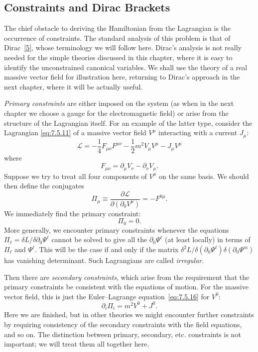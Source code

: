 \subsection{Constraints and Dirac Brackets}

The chief obstacle to deriving the Hamiltonian from the Lagrangian is the
occurrence of constraints. The standard analysis of this problem is that of
Dirac~\hyperref[ref:7.5]{[5]}, whose terminology we will follow here. Dirac's analysis is not
really needed for the simple theories discussed in this chapter, where it is
easy to identify the unconstrained canonical variables. We shall use the
theory of a real massive vector field for illustration here, returning to
Dirac's approach in the next chapter, where it will be actually useful.

\emph{Primary constraints} are either imposed on the system (as when in the
next chapter we choose a gauge for the electromagnetic field) or arise from
the structure of the Lagrangian itself. For an example of the latter type,
consider the Lagrangian \eqref{eq:7.5.11} of a massive vector field $V^\mu$ interacting
with a current $J_\mu$:
\begin{equation}
\mathcal L=-\frac14F_{\mu\nu}F^{\mu\nu}
-\frac12m^2V_\mu V^\mu-J_\mu V^\mu
\tag{7.6.1}\label{eq:7.6.1}
\end{equation}
where
\begin{equation}
F_{\mu\nu}=\partial_\mu V_\nu-\partial_\nu V_\mu.
\tag{7.6.2}\label{eq:7.6.2}
\end{equation}
Suppose we try to treat all four components of $V^\mu$ on the same basis. We
should then define the conjugates
\begin{equation}
\Pi_\mu\equiv\frac{\partial\mathcal L}{\partial(\partial_0V^\mu)}=-F^{0\mu}.
\tag{7.6.3}\label{eq:7.6.3}
\end{equation}
We immediately find the primary constraint:
\begin{equation}
\Pi_0=0.
\tag{7.6.4}\label{eq:7.6.4}
\end{equation}
More generally, we encounter primary constraints whenever the equations
$\Pi_\ell=\delta L/\delta\partial_0\Psi^\ell$ cannot be solved to give all the
$\partial_0\Psi^\ell$ (at least locally) in terms of $\Pi_\ell$ and
$\Psi^\ell$. This will be the case if and only if the matrix
$\delta^2L/\delta(\partial_0\Psi^\ell)\delta(\partial_0\Psi^m)$ has vanishing
determinant. Such Lagrangians are called \emph{irregular}.

Then there are \emph{secondary constraints}, which arise from the requirement
that the primary constraints be consistent with the equations of motion. For
the massive vector field, this is just the Euler--Lagrange equation~\eqref{eq:7.5.16}
for $V^0$:
\begin{equation}
\partial_i\Pi_i=m^2V^0+J^0.
\tag{7.6.5}\label{eq:7.6.5}
\end{equation}
Here we are finished, but in other theories we might encounter further
constraints by requiring consistency of the secondary constraints with the
field equations, and so on. The distinction between primary, secondary, etc.
constraints is not important; we will treat them all together here.

